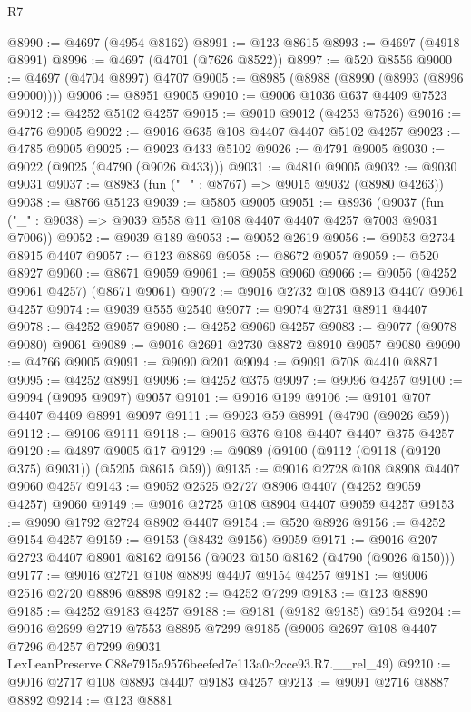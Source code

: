 \begin{lexlean}{R7}
\begin{coremodule}
@8990 := @4697 (@4954 @8162)
@8991 := @123 @8615
@8993 := @4697 (@4918 @8991)
@8996 := @4697 (@4701 (@7626 @8522))
@8997 := @520 @8556
@9000 := @4697 (@4704 @8997) @4707
@9005 := @8985 (@8988 (@8990 (@8993 (@8996 @9000))))
@9006 := @8951 @9005
@9010 := @9006 @1036 @637 @4409 @7523
@9012 := @4252 @5102 @4257
@9015 := @9010 @9012 (@4253 @7526)
@9016 := @4776 @9005
@9022 := @9016 @635 @108 @4407 @4407 @5102 @4257
@9023 := @4785 @9005
@9025 := @9023 @433 @5102
@9026 := @4791 @9005
@9030 := @9022 (@9025 (@4790 (@9026 @433)))
@9031 := @4810 @9005
@9032 := @9030 @9031
@9037 := @8983 (fun ("_" : @8767) => @9015 @9032 (@8980 @4263))
@9038 := @8766 @5123
@9039 := @5805 @9005
@9051 := @8936
    (@9037 (fun ("_" : @9038) => @9039 @558 @11 @108 @4407 @4407 @4257 @7003 @9031 @7006))
@9052 := @9039 @189
@9053 := @9052 @2619
@9056 := @9053 @2734 @8915 @4407
@9057 := @123 @8869
@9058 := @8672 @9057
@9059 := @520 @8927
@9060 := @8671 @9059
@9061 := @9058 @9060
@9066 := @9056 (@4252 @9061 @4257) (@8671 @9061)
@9072 := @9016 @2732 @108 @8913 @4407 @9061 @4257
@9074 := @9039 @555 @2540
@9077 := @9074 @2731 @8911 @4407
@9078 := @4252 @9057
@9080 := @4252 @9060 @4257
@9083 := @9077 (@9078 @9080) @9061
@9089 := @9016 @2691 @2730 @8872 @8910 @9057 @9080
@9090 := @4766 @9005
@9091 := @9090 @201
@9094 := @9091 @708 @4410 @8871
@9095 := @4252 @8991
@9096 := @4252 @375
@9097 := @9096 @4257
@9100 := @9094 (@9095 @9097) @9057
@9101 := @9016 @199
@9106 := @9101 @707 @4407 @4409 @8991 @9097
@9111 := @9023 @59 @8991 (@4790 (@9026 @59))
@9112 := @9106 @9111
@9118 := @9016 @376 @108 @4407 @4407 @375 @4257
@9120 := @4897 @9005 @17
@9129 := @9089 (@9100 (@9112 (@9118 (@9120 @375) @9031)) (@5205 @8615 @59))
@9135 := @9016 @2728 @108 @8908 @4407 @9060 @4257
@9143 := @9052 @2525 @2727 @8906 @4407 (@4252 @9059 @4257) @9060
@9149 := @9016 @2725 @108 @8904 @4407 @9059 @4257
@9153 := @9090 @1792 @2724 @8902 @4407
@9154 := @520 @8926
@9156 := @4252 @9154 @4257
@9159 := @9153 (@8432 @9156) @9059
@9171 := @9016 @207 @2723 @4407 @8901 @8162 @9156 (@9023 @150 @8162 (@4790 (@9026 @150)))
@9177 := @9016 @2721 @108 @8899 @4407 @9154 @4257
@9181 := @9006 @2516 @2720 @8896 @8898
@9182 := @4252 @7299
@9183 := @123 @8890
@9185 := @4252 @9183 @4257
@9188 := @9181 (@9182 @9185) @9154
@9204 := @9016
    @2699
    @2719
    @7553
    @8895
    @7299
    @9185
    (@9006
      @2697
      @108
      @4407
      @7296
      @4257
      @7299
      @9031
      LexLeanPreserve.C88e7915a9576beefed7e113a0c2cce93.R7.__rel_49)
@9210 := @9016 @2717 @108 @8893 @4407 @9183 @4257
@9213 := @9091 @2716 @8887 @8892
@9214 := @123 @8881

\end{coremodule}
\end{lexlean}

